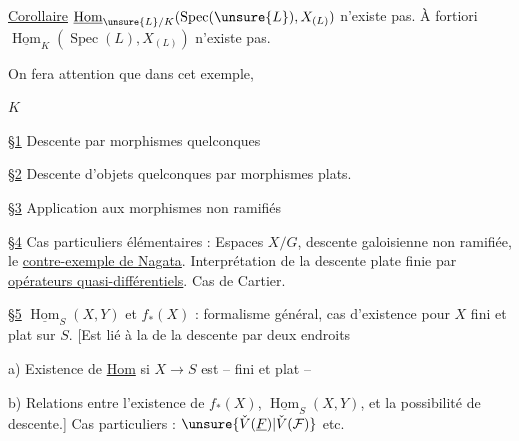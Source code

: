 
\uline{Corollaire} $\underline{\operatorname{Hom}}_{\unsure{L}/K}(\operatorname{Spec}(\unsure{L}),X_{(L)})$ n'existe pas. À fortiori $\underline{\operatorname{Hom}}_K(\operatorname{Spec}(L),X_{(L)})$ n'existe pas.

On fera attention que dans cet exemple,

$K$

\uline{\S1} Descente  par morphismes quelconques

\uline{\S2} Descente d'objets quelconques par morphismes plats.

\uline{\S3} Application  aux morphismes non ramifiés

\uline{\S4} Cas particuliers élémentaires : Espaces $X/G$, descente galoisienne non ramifiée, le \uline{contre-exemple de Nagata}. Interprétation de la descente plate finie par \uline{opérateurs quasi-différentiels}. Cas de Cartier.

\uline{\S5} $\underline{\operatorname{Hom}}_S(X,Y)$ et $f_*(X)$ : formalisme général, cas d'existence pour $X$ fini et plat sur $S$. [Est lié à la  de la descente  par deux endroits

a) Existence de \uline{Hom} si $X\to S$ est  -- fini et plat --

b) Relations entre l'existence de $f_*(X)$, $\underline{\operatorname{Hom}}_S(X,Y)$, et la possibilité de descente.] Cas particuliers : $\unsure{\check V(\underline F)|\check V(\mathcal F)}$ etc.

